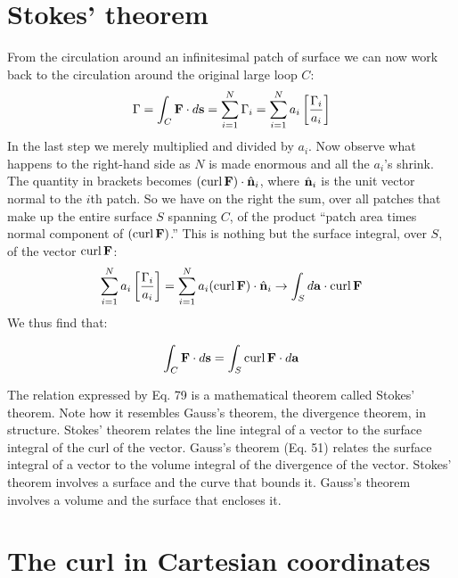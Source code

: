 \section{Stokes' theorem}

From the circulation around an infinitesimal patch of surface we
can now work back to the circulation around the original large
loop $C$:
\begin{equation}
  \Gamma = \int_C \mathbf{F}\cdot d\mathbf{s}
      = \sum_{i=1}^N \Gamma_i
      = \sum_{i=1}^N a_i\left[\frac{\Gamma_i}{a_i}\right]
\end{equation}
In the last step we merely multiplied and divided by $a_i$. Now observe
what happens to the right-hand side as $N$ is made enormous and all
the $a_i$'s shrink. The quantity in brackets becomes $(\operatorname{curl}\mathbf{F})\cdot\hat{\mathbf{n}}_i$,
where $\hat{\mathbf{n}}_i$ is the unit vector normal to the $i$th patch. So we have on
the right the sum, over all patches that make up the entire surface $S$
spanning $C$, of the product ``patch area times normal component of
$(\operatorname{curl}\mathbf{F})$.'' This is nothing but the surface integral, over $S$, of the
vector $\operatorname{curl}\mathbf{F}$:
\begin{equation}
  \sum_{i=1}^N a_i\left[\frac{\Gamma_i}{a_i}\right]
    = \sum_{i=1}^N a_i(\operatorname{curl}\mathbf{F})\cdot\hat{\mathbf{n}}_i
    \rightarrow \int_S d\mathbf{a}\cdot\operatorname{curl}\mathbf{F}
\end{equation}
We thus find that:
\begin{framed}
\begin{equation}
  \int_C \mathbf{F}\cdot d\mathbf{s} = \int_S \operatorname{curl}\mathbf{F}\cdot d\mathbf{a}
\end{equation}
\end{framed}

The relation expressed by Eq. 79 is a mathematical theorem called
Stokes' theorem. Note how it resembles Gauss's theorem, the divergence
theorem, in structure. Stokes' theorem relates the line integral
of a vector to the surface integral of the curl of the vector. Gauss's
theorem (Eq. 51) relates the surface integral of a vector to the volume
integral of the divergence of the vector. Stokes' theorem involves
a surface and the curve that bounds it. Gauss's theorem involves a
volume and the surface that encloses it.


\section{The curl in Cartesian coordinates}

